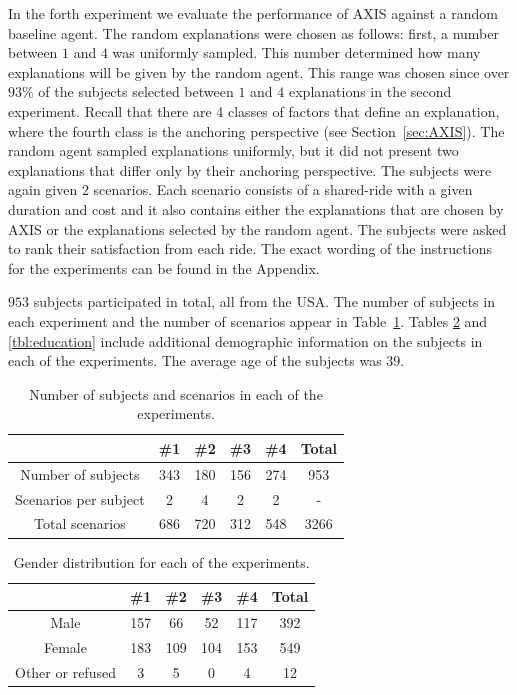 \documentclass[letterpaper]{article} %
\begin{document}
In the forth experiment we evaluate the performance of AXIS against a random baseline agent.
The random explanations were chosen as follows: first, a number between $1$ and $4$ was uniformly sampled. This number determined how many explanations will be given by the random agent. This range was chosen since over $93\%$ of the subjects selected between $1$ and $4$ explanations in the second experiment.
Recall that there are 4 classes of factors that define an explanation, where the fourth class is the anchoring perspective (see Section~\ref{sec:AXIS}). The random agent sampled explanations uniformly, but it did not present two explanations that differ only by their anchoring perspective.
%
The subjects were again given $2$ scenarios. Each scenario consists of a shared-ride with a given duration and cost and it also contains either the explanations that are chosen by AXIS or the explanations selected by the random agent. The subjects were asked to rank their satisfaction from each ride.
The exact wording of the instructions for the experiments can be found in the Appendix.

$953$ subjects participated in total, all from the USA.
The number of subjects in each experiment and the number of scenarios appear in Table~\ref{tbl:participants}.
Tables \ref{tbl:gender} and \ref{tbl:education} include additional demographic information on the subjects in each of the experiments. The average age of the subjects was $39$. %

\begin{table}
\centering
\begin{tabular}{ c|c c c c c }
\hline
 & \#1 & \#2 & \#3 & \#4 & Total\\
 \hline
Number of subjects & 343 & 180 & 156 & 274 & 953\\
Scenarios per subject & 2 & 4 & 2 & 2 & -\\
Total scenarios & 686 & 720 & 312 & 548 & 3266\\
 \hline
\end{tabular}
\caption{Number of subjects and scenarios in each of the experiments.}
\label{tbl:participants}
\end{table}


\begin{table}
\centering
\begin{tabular}{ c|c c c c c}
\hline
 & \#1 & \#2 & \#3 & \#4 & Total\\
 \hline
Male & 157 & 66 & 52 & 117 & 392\\
Female & 183 & 109 & 104 & 153 & 549\\
Other or refused & 3 & 5 & 0 & 4 & 12\\
 \hline
\end{tabular}
\caption{Gender distribution for each of the experiments.}
\label{tbl:gender}
\end{table}
\end{document}
